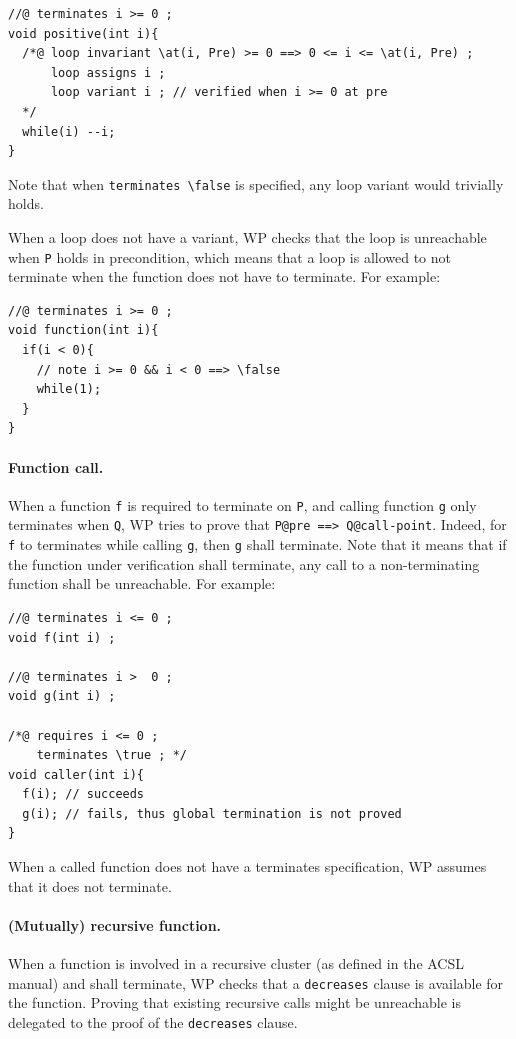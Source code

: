 \begin{lstlisting}[style=c]
//@ terminates i >= 0 ;
void positive(int i){
  /*@ loop invariant \at(i, Pre) >= 0 ==> 0 <= i <= \at(i, Pre) ;
      loop assigns i ;
      loop variant i ; // verified when i >= 0 at pre
  */
  while(i) --i;
}
\end{lstlisting}

Note that when \verb+terminates \false+ is specified, any loop
variant would trivially holds.

When a loop does not have a variant, WP checks that the loop is unreachable
when \verb+P+ holds in precondition, which means that a loop is allowed to not
terminate when the function does not have to terminate. For example:

\begin{lstlisting}[style=c]
//@ terminates i >= 0 ;
void function(int i){
  if(i < 0){
    // note i >= 0 && i < 0 ==> \false
    while(1);
  }
}
\end{lstlisting}

\paragraph{Function call.} When a function \verb+f+ is required to terminate on
\verb+P+, and calling function \verb+g+ only terminates when \verb+Q+, WP tries to
prove that \verb+P@pre ==> Q@call-point+. Indeed, for \verb+f+ to terminates while calling
\verb+g+, then \verb+g+ shall terminate. Note that it
means that if the function under verification shall terminate, any call to a
non-terminating function shall be unreachable. For example:

\begin{lstlisting}[style=c]
//@ terminates i <= 0 ;
void f(int i) ;

//@ terminates i >  0 ;
void g(int i) ;

/*@ requires i <= 0 ;
    terminates \true ; */
void caller(int i){
  f(i); // succeeds
  g(i); // fails, thus global termination is not proved
}
\end{lstlisting}

When a called function does not have a terminates specification, WP assumes that
it does not terminate.

\paragraph{(Mutually) recursive function.} When a function is involved in a
recursive cluster (as defined in the ACSL manual) and shall terminate, WP checks that a
\verb+decreases+ clause is available for the function. Proving that existing
recursive calls might be unreachable is delegated to the proof of the
\verb+decreases+ clause.

